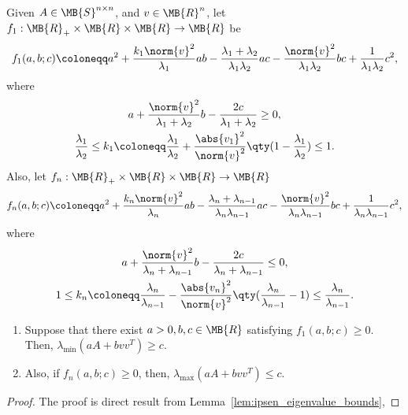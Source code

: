 \documentclass[nobib]{my-handout}
\begin{document}
Given $A \in \MB{S}^{n \times n}$, and $v \in \MB{R}^n$, let $f_1 :
\MB{R}_{+} \times \MB{R} \times \MB{R} \to \MB{R}$ be
\begin{equation*}
	f_1(a, b; c) \coloneqq a^2 + \frac{k_1 \norm{v}^2}{\lambda_1} a b -
	\frac{\lambda_1 + \lambda_2}{\lambda_1 \lambda_2} a c -
	\frac{\norm{v}^2}{\lambda_1 \lambda_2} b c +
	\frac{1}{\lambda_1 \lambda_2} c^2,
\end{equation*}
where
\begin{gather*}
	a + \frac{\norm{v}^2}{\lambda_1 + \lambda_2} b - \frac{2 c}{\lambda_1
	+ \lambda_2} \ge 0,\\
	\frac{\lambda_1}{\lambda_2} \le k_1 \coloneqq \frac{\lambda_1}{\lambda_2} +
	\frac{\abs{v_1}^2}{\norm{v}^2} \qty(1 - \frac{\lambda_1}{\lambda_2}) \le 1.
\end{gather*}
Also, let $f_n : \MB{R}_{+} \times \MB{R} \times \MB{R} \to \MB{R}$
\begin{equation*}
	f_n(a, b; c) \coloneqq a^2 + \frac{k_n \norm{v}^2}{\lambda_n} a b -
	\frac{\lambda_n + \lambda_{n-1}}{\lambda_n \lambda_{n-1}} a c -
	\frac{\norm{v}^2}{\lambda_n \lambda_{n-1}} b c + \frac{1}{\lambda_n
	\lambda_{n-1}} c^2,
\end{equation*}
where
\begin{gather*}
	a + \frac{\norm{v}^2}{\lambda_n + \lambda_{n-1}} b - \frac{2 c}{\lambda_n +
	\lambda_{n-1}} \le 0, \\
	1 \le k_n \coloneqq \frac{\lambda_n}{\lambda_{n-1}} -
	\frac{\abs{v_n}^2}{\norm{v}^2} \qty(\frac{\lambda_n}{\lambda_{n-1}} - 1) \le
	\frac{\lambda_n}{\lambda_{n-1}}.
\end{gather*}

\begin{theorem}
	\begin{enumerate}
		\item Suppose that there exist $a>0, b, c \in \MB{R}$ satisfying
			$f_1(a, b; c) \ge 0$. Then, $\lambda_{\min}(a A + b v v^T) \ge c$.
		\item Also, if $f_n(a, b; c) \ge 0$, then, $\lambda_{\max}(a A + b v
			v^T) \le c$.
		\end{enumerate}
\end{theorem}

\begin{proof}
	The proof is direct result from Lemma~\ref{lem:ipsen_eigenvalue_bounds},
\end{proof}
\end{document}
